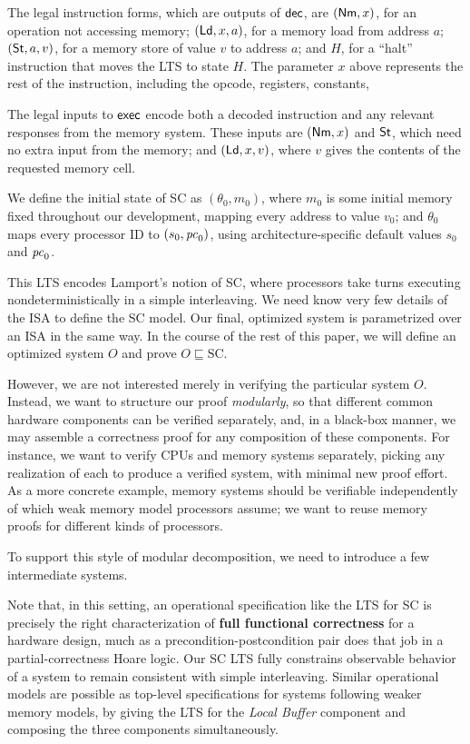 The legal instruction forms, which are outputs of $\mathsf{dec}$, are $(\mathsf{Nm}, x)$, for
an operation not accessing memory; $(\mathsf{Ld}, x, a)$, for a memory load from
address $a$; $(\mathsf{St}, a, v)$, for a memory store of value $v$ to address $a$; and
$H$, for a ``halt'' instruction that moves the LTS to state $H$. The parameter
$x$ above represents the rest of the instruction, including the
opcode, registers, constants, \etc{}

The legal inputs to $\mathsf{exec}$ encode both a decoded instruction and any relevant
responses from the memory system.  These inputs are $(\mathsf{Nm}, x)$ and $\mathsf{St}$, which
need no extra input from the memory; and $(\mathsf{Ld}, x, v)$, where $v$ gives the
contents of the requested memory cell.

We define the initial state of SC as $(\theta_0, m_0)$, where $m_0$ is
some initial memory fixed throughout our development, mapping every
address to value $v_0$; and $\theta_0$ maps every processor ID to
$(s_0, \mathit{pc}_0)$, using architecture-specific default values $s_0$ and
$\mathit{pc}_0$.

\medskip

This LTS encodes Lamport's notion of SC, where processors take turns executing
nondeterministically in a simple interleaving.  We need know very few details
of the ISA to define the SC model.  Our final, optimized system is parametrized
over an ISA in the same way.  In the course of the rest of this paper, we will
define an optimized system $O$ and prove $O \sqsubseteq \text{SC}$.

However, we are not interested merely in verifying the particular system $O$.
Instead, we want to structure our proof \emph{modularly}, so that different
common hardware components can be verified separately, and, in a black-box
manner, we may assemble a correctness proof for any composition of these
components.  For instance, we want to verify CPUs and memory systems
separately, picking any realization of each to produce a verified system, with
minimal new proof effort. As a more concrete example, memory systems should be
verifiable independently of which weak memory model processors assume; we want
to reuse memory proofs for different kinds of processors.

To support this style of modular decomposition, we need to introduce a few
intermediate systems.

Note that, in this setting, an operational specification like the LTS
for SC is precisely the right characterization of \textbf{full functional
  correctness} for a hardware design, much as a
precondition-postcondition pair does that job in a partial-correctness
Hoare logic.  Our SC LTS fully constrains observable behavior of a
system to remain consistent with simple interleaving.  Similar
operational models are possible as top-level specifications for
systems following weaker memory models, by giving the LTS for the \emph{Local
Buffer} component and composing the three components simultaneously.


